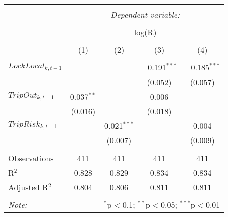 \small 
\begin{tabular}{@{\extracolsep{5pt}}lcccc} 
\\[-1.8ex]\hline 
\hline \\[-1.8ex] 
 & \multicolumn{4}{c}{\textit{Dependent variable:}} \\ 
\cline{2-5} 
\\[-1.8ex] & \multicolumn{4}{c}{log(R)} \\ 
\\[-1.8ex] & (1) & (2) & (3) & (4)\\ 
\hline \\[-1.8ex] 
 $LockLocal_{k,t-1}$ &  &  & $-$0.191$^{***}$ & $-$0.185$^{***}$ \\ 
  &  &  & (0.052) & (0.057) \\ 
  $TripOut_{k,t-1}$ & 0.037$^{**}$ &  & 0.006 &  \\ 
  & (0.016) &  & (0.018) &  \\ 
  $TripRisk_{k,t-1}$ &  & 0.021$^{***}$ &  & 0.004 \\ 
  &  & (0.007) &  & (0.009) \\ 
 \hline \\[-1.8ex] 
Observations & 411 & 411 & 411 & 411 \\ 
R$^{2}$ & 0.828 & 0.829 & 0.834 & 0.834 \\ 
Adjusted R$^{2}$ & 0.804 & 0.806 & 0.811 & 0.811 \\ 
\hline 
\hline \\[-1.8ex] 
\textit{Note:}  & \multicolumn{4}{r}{$^{*}$p$<$0.1; $^{**}$p$<$0.05; $^{***}$p$<$0.01} \\ 
\end{tabular} 
